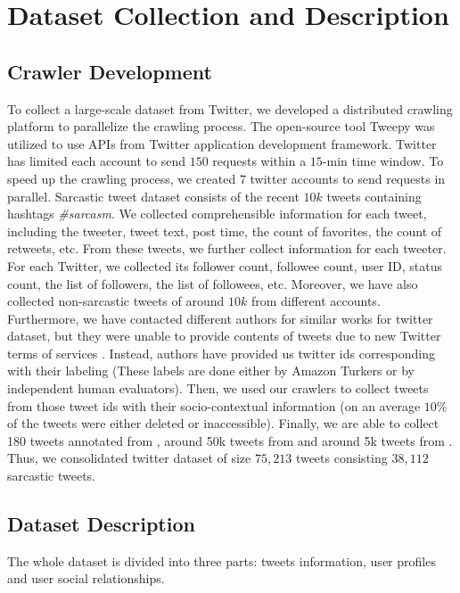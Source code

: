 \section{Dataset Collection and Description}
\label{sec:dataset}
\subsection{Crawler Development}
To collect a large-scale dataset from Twitter, we developed a distributed crawling platform to parallelize the crawling process. The open-source tool Tweepy \cite{tweepy} was utilized to use APIs from Twitter application development framework. Twitter has limited each account to send $150$ requests within a $15$-min time window. To speed up the crawling process, we created $7$ twitter accounts to send requests in parallel. Sarcastic tweet dataset consists of the recent $10k$ tweets containing hashtags \emph{\#sarcasm}. We collected comprehensible information for each tweet, including the tweeter, tweet text, post time, the count of favorites, the count of retweets, etc. From these tweets, we further collect information for each tweeter. For each Twitter, we collected its follower count, followee count, user ID, status count, the list of followers, the list of followees, etc. Moreover, we have also collected non-sarcastic tweets of around $10k$ from different accounts.\\

Furthermore, we have contacted different authors \cite{davidov10,riloff13,tomas14} for similar works for twitter dataset, but they were unable to provide contents of tweets due to new Twitter terms of services \cite{twitter_tos}. Instead, authors \cite{davidov10,riloff13,tomas14} have provided us twitter ids corresponding with their labeling (These labels are done either by Amazon Turkers or by independent human evaluators). Then, we used our crawlers to collect tweets from those tweet ids with their socio-contextual information (on an average $10\%$ of the tweets were either deleted or inaccessible). Finally, we are able to collect 180 tweets annotated from \cite{davidov10}, around 50k tweets from \cite{tomas14} and around 5k tweets from \cite{riloff13}. Thus, we consolidated twitter dataset of size $75,213$ tweets consisting $38,112$ sarcastic tweets.

\subsection{Dataset Description}
The whole dataset is divided into three parts: tweets information, user profiles and user social relationships.

